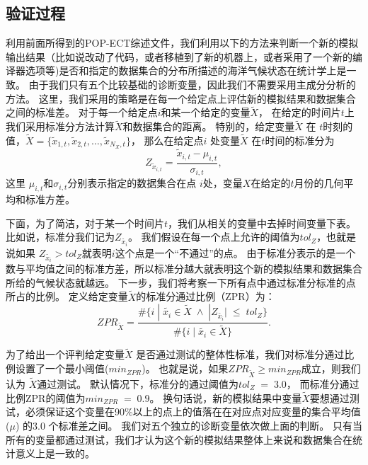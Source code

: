 \subsection{验证过程}
\label{verify:ECTprocess}
 
利用前面所得到的POP-ECT综述文件，我们利用以下的方法来判断一个新的模拟输出结果（比如说改动了代码，或者移植到了新的机器上，或者采用了一个新的编译器选项等)是否和指定的数据集合的分布所描述的海洋气候状态在统计学上是一致。 
由于我们只有五个比较基础的诊断变量，因此我们不需要采用主成分分析的方法。 
这里，我们采用的策略是在每一个给定点上评估新的模拟结果和数据集合之间的标准差。
对于每一个给定点$i$和某一个给定的变量$\tilde{{X}}$， 在给定的时间片$t$上我们采用标准分方法计算$\tilde{{X}}$和数据集合的距离。 
特别的，给定变量$\tilde{{X}}$ 在 $t$时刻的值，$\tilde{{X}} = \{ \tilde{x}_{1,t}, \tilde{x}_{2,t}, \dots, \tilde{x}_{N_X,t}\}$， 那么在给定点$i$ 处变量$\tilde{{X}}$ 在$t$时间的标准分为
\begin{equation*}
Z_{\tilde{x}_{i,t}}=  \frac{\tilde{x}_{i,t} -\mu_{i,t}}{\sigma_{i,t}},
\end{equation*}
这里 $\mu_{i,t}$和$\sigma_{i,t}$分别表示指定的数据集合在点 $i$处，变量$X$在给定的$t$月份的几何平均和标准方差。  

 
下面，为了简洁，对于某一个时间片$t$，我们从相关的变量中去掉时间变量下表。比如说，标准分我们记为$Z_{\tilde{x_i}}$。 
我们假设在每一个点上允许的阈值为$tol_{Z}$，也就是说如果 $Z_{\tilde{x_i}} > tol_{Z}$就表明$i$这个点是一个“不通过”的点。 
由于标准分表示的是一个数与平均值之间的标准方差，所以标准分越大就表明这个新的模拟结果和数据集合所给的气候状态就越远。 
下一步，我们将考察一下所有点中通过标准分标准的点所占的比例。 定义给定变量$\tilde{X}$的标准分通过比例（ZPR）为：
\begin{equation}\label{e:zpr}
ZPR_{\tilde{X}} = \frac{ \#\{i \;|\; \tilde{x_i} \in \tilde{X} \; \land \; |Z_{\tilde{x_i}}| \; \leq \; tol_{Z}\} }{\#\{i \;|\; \tilde{x_i} \in \tilde{X} \} }.
\end{equation}
 
为了给出一个评判给定变量$\tilde{X}$ 是否通过测试的整体性标准，我们对标准分通过比例设置了一个最小阈值($min_{ZPR}$)。 
也就是说，如果$ZPR_{\tilde{X}} \geq min_{ZPR}$成立，则我们认为 $\tilde{X}$通过测试。
默认情况下，标准分的通过阈值为$tol_{Z} \; = \; 3.0$， 而标准分通过比例ZPR的阈值为$min_{ZPR} \; = \; 0.9$。 
换句话说，新的模拟结果中变量$\tilde{X}$要想通过测试，必须保证这个变量在90$\%$以上的点上的值落在在对应点对应变量的集合平均值($\mu$) 的$3.0$ 个标准差之间。
我们对五个独立的诊断变量依次做上面的判断。 
只有当所有的变量都通过测试，我们才认为这个新的模拟结果整体上来说和数据集合在统计意义上是一致的。


